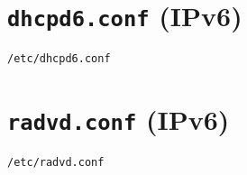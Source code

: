 \documentclass[9pt, a4paper, oneside]{article}
\begin{document}
		\section{\texttt{dhcpd6.conf} (IPv6)}
			\par
			 	\texttt{/etc/dhcpd6.conf}
			\par
			\texttt{}
			\newpage
		\section{\texttt{radvd.conf} (IPv6)}
			\par
			 	\texttt{/etc/radvd.conf}
			\par
			\texttt{}
\end{document}
